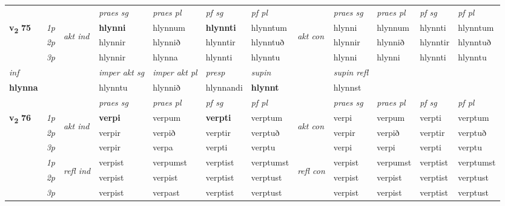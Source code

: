 \begin{longtable}[l]{X>{\footnotesize\itshape}llXXXXlXXXX}
 & &   & \textit{praes sg}  & \textit{praes pl}    & \textit{ pf sg} & \textit{pf pl} & & \textit{praes sg}  & \textit{praes pl}    & \textit{pf sg} & \textit{pf pl }  \\ \cmidrule{4-7} \cmidrule{9-12}
 \multirow{2}{*}{{{\textbf{v{\textsubscript{2}}} \Large{\textbf{75}}}}}  & 1p & \multirow{3}{*}{\begin{turn}{90}\textit{akt ind}\end{turn}} & \textbf{hlynni} & hlynnum & \textbf{hlynnti} & hlynntum & \multirow{3}{*}{\begin{turn}{90}\textit{akt con}\end{turn}} &hlynni & hlynnum & hlynnti & hlynntum\\*
 & 2p &  &  hlynnir  & hlynnið & hlynntir & hlynntuð & & hlynnir & hlynnið & hlynntir & hlynntuð \\*
 & 3p &  & hlynnir & hlynna & hlynnti & hlynntu & & hlynni & hlynni& hlynnti & hlynntu \\*
\cmidrule{4-7} \cmidrule{9-12}

   {\textit{inf}} & &  & \textit{imper akt sg} & \textit{imper akt pl}   & \textit{presp} & \textit{supin} && \textit{supin refl}  \\*
  {\textbf{hlynna}} & && hlynntu  & hlynnið   & hlynnandi &  \textbf{hlynnt} && hlynnst  \\*

\midrule

 & &   & \textit{praes sg}  & \textit{praes pl}    & \textit{ pf sg} & \textit{pf pl} & & \textit{praes sg}  & \textit{praes pl}    & \textit{pf sg} & \textit{pf pl }  \\ \cmidrule{4-7} \cmidrule{9-12}
 \multirow{2}{*}{{{\textbf{v{\textsubscript{2}}} \Large{\textbf{76}}}}}  & 1p & \multirow{3}{*}{\begin{turn}{90}\textit{akt ind}\end{turn}} & \textbf{verpi} & verpum & \textbf{verpti} & verptum & \multirow{3}{*}{\begin{turn}{90}\textit{akt con}\end{turn}} &verpi & verpum & verpti & verptum\\*
 & 2p &  &  verpir  & verpið & verptir & verptuð & & verpir & verpið & verptir & verptuð \\*
 & 3p &  & verpir & verpa & verpti & verptu & & verpi & verpi& verpti & verptu \\*
\cmidrule{4-7} \cmidrule{9-12}
 & 1p & \multirow{3}{*}{\begin{turn}{90}\textit{refl ind}\end{turn}}  & verpist & verpumst & verptist & verptumst & \multirow{3}{*}{\begin{turn}{90}\textit{refl con}\end{turn}}  &verpist & verpumst & verptist & verptumst \\*
 & 2p &  & verpist & verpist & verptist & verptust & &verpist & verpist & verptist & verptust \\*
 & 3p  & & verpist & verpast & verptist & verptust & & verpist & verpist& verptist & verptust \\*
\cmidrule{4-7} \cmidrule{9-12}


\end{longtable}
